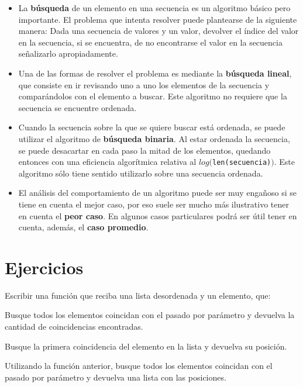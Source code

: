 \begin{itemize}

\item La {\bf búsqueda} de un elemento en una secuencia es un
algoritmo básico pero importante. El problema que intenta resolver puede
plantearse de la siguiente manera: Dada una secuencia de valores y un
valor, devolver el índice del valor en la secuencia, si se encuentra, de no
encontrarse el valor en la secuencia señalizarlo apropiadamente.

\item Una de las formas de resolver el problema es mediante la {\bf
búsqueda lineal}, que consiste en ir revisando uno a uno los elementos de
la secuencia y comparándolos con el elemento a buscar.  Este algoritmo no
requiere que la secuencia se encuentre ordenada.

\item Cuando la secuencia sobre la que se quiere buscar está ordenada, se
puede utilizar el algoritmo de {\bf búsqueda binaria}.  Al estar ordenada
la secuencia, se puede desacartar en cada paso la mitad de los elementos,
quedando entonces con una eficiencia algorítmica relativa al
$log($\lstinline!len(secuencia)!$)$. Este algoritmo sólo tiene sentido
utilizarlo sobre una secuencia ordenada.

\item El análisis del comportamiento de un algoritmo puede ser muy engañoso
si se tiene en cuenta el mejor caso, por eso suele ser mucho más
ilustrativo tener en cuenta el {\bf peor caso}.  En algunos casos
particulares podrá ser útil tener en cuenta, además, el {\bf caso
promedio}.
\end{itemize}


\newpage
\section{Ejercicios}

\begin{ejercicio}
Escribir una función que reciba una lista desordenada y un elemento, que:
\begin{partes}
\item Busque todos los elementos coincidan con el pasado por parámetro y
devuelva la cantidad de coincidencias encontradas.
\item Busque la primera coincidencia del elemento en la lista y devuelva su
posición.
\item Utilizando la función anterior, busque todos los elementos coincidan
con el pasado por parámetro y devuelva una lista con las posiciones.
\end{partes}
\end{ejercicio}


